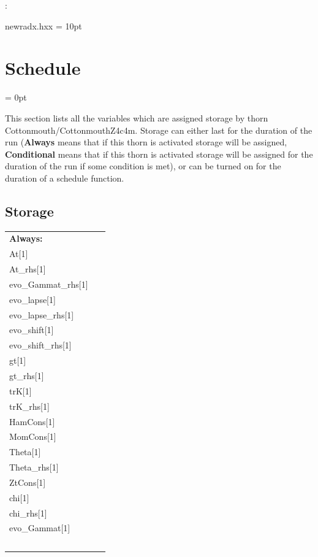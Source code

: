 \documentclass{article}
\begin{document}
\vspace{5mm}

: 

newradx.hxx
\vspace{2mm}\parskip = 10pt 

\section{Schedule} 


\parskip = 0pt


\noindent This section lists all the variables which are assigned storage by thorn Cottonmouth/CottonmouthZ4c4m.  Storage can either last for the duration of the run ({\bf Always} means that if this thorn is activated storage will be assigned, {\bf Conditional} means that if this thorn is activated storage will be assigned for the duration of the run if some condition is met), or can be turned on for the duration of a schedule function.


\subsection*{Storage}

\hspace{5mm}

 \begin{tabular*}{160mm}{ll} 

{\bf Always:}&  ~ \\ 
 At[1] & ~\\ 
 At\_rhs[1] & ~\\ 
 evo\_Gammat\_rhs[1] & ~\\ 
 evo\_lapse[1] & ~\\ 
 evo\_lapse\_rhs[1] & ~\\ 
 evo\_shift[1] & ~\\ 
 evo\_shift\_rhs[1] & ~\\ 
 gt[1] & ~\\ 
 gt\_rhs[1] & ~\\ 
 trK[1] & ~\\ 
 trK\_rhs[1] & ~\\ 
 HamCons[1] & ~\\ 
 MomCons[1] & ~\\ 
 Theta[1] & ~\\ 
 Theta\_rhs[1] & ~\\ 
 ZtCons[1] & ~\\ 
 chi[1] & ~\\ 
 chi\_rhs[1] & ~\\ 
 evo\_Gammat[1] & ~\\ 
~ & ~\\ 
\end{tabular*} 
\end{document}
